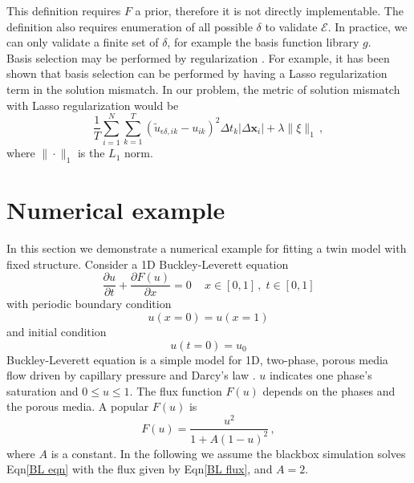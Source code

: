 \documentclass[a4paper,onecolumn]{article}
\theoremstyle{remark}
\begin{document}
\noindent This definition requires $F$ a prior, therefore it is not directly implementable.
The definition also requires enumeration of all possible $\delta$ to validate $\mathcal{E}$.
In practice, we can only validate a finite set of $\delta$, for example the basis function library
$g$.
\\

\noindent Basis selection may be performed by regularization \cite{Lasso variable selection,
Critical review of variable selection}. 
For example, it has been shown that basis selection can be performed by having a
Lasso regularization term in the solution mismatch. In our problem, the metric of
solution mismatch with Lasso regularization would be
\begin{equation}
    \frac{1}{T}
    \sum_{i=1}^{N}\sum_{k=1}^{T} \left(\tilde{u}_{\epsilon\delta, ik} - u_{ik}\right)^2 \Delta t_k
    \left| \Delta \mathbf{x}_i \right|
    + \lambda \|\xi\|_1\,,
    \label{Lasso mismatch}
\end{equation}
where $\|\cdot\|_1$ is the $L_1$ norm. \\

\section{Numerical example}
\label{numerical example}
In this section we demonstrate a numerical example for fitting a twin model with fixed structure.
Consider a 1D Buckley-Leverett equation
\begin{equation}
    \frac{\partial u}{\partial t} + \frac{\partial F(u)}{\partial x} = 0\,\quad x\in[0,1]\,,\; t\in[0,1]
    \label{BL eqn}
\end{equation}
with periodic boundary condition
\begin{equation}
    u(x=0) = u(x=1)
\end{equation}
and initial condition
\begin{equation}
    u(t=0) = u_0
\end{equation}
Buckley-Leverett equation is a simple model for 1D, two-phase, porous media flow driven by
capillary pressure and Darcy's law \cite{Buckley Leverett}. $u$
indicates one phase's saturation and $0\le u\le 1$.
The flux function $F(u)$ depends on the phases and the porous media. 
A popular $F(u)$ is
\begin{equation}
    F(u) = \frac{u^2}{1+A(1-u)^2}\,,
    \label{BL flux}
\end{equation}
where $A$ is a constant. In the following we assume the blackbox simulation
solves Eqn\eqref{BL eqn} with the flux given by Eqn\eqref{BL flux}, and $A=2$.
\\
\end{document}
